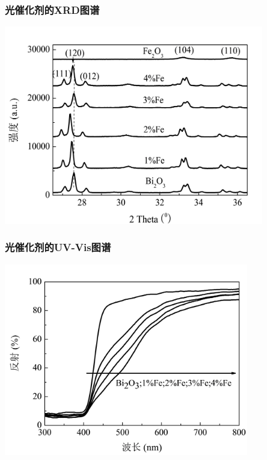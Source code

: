 \documentclass[xetex,compress]{mybeamer}
\begin{document}
\begin{frame}
\frametitle{光催化剂的XRD图谱}
\begin{block}{}
\centering
\includegraphics[width=0.85\textwidth]{figures/三氧化二铁XRD} 
\end{block}
\end{frame}

\begin{frame}
\frametitle{光催化剂的UV-Vis图谱}
\begin{block}{}
\centering
\includegraphics[width=0.8\textwidth]{figures/三氧化二铁UV.jpg} 
\end{block}
\end{frame}
\end{document}
